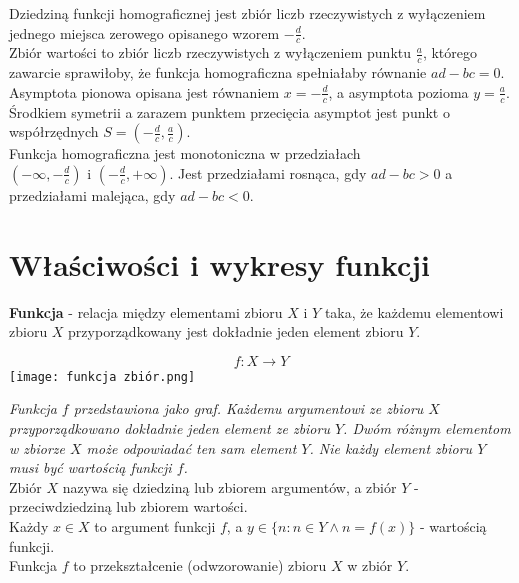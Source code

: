 \documentclass[14pt,a4paper]{extarticle}
\begin{document}
\noindent Dziedziną funkcji homograficznej jest zbiór liczb rzeczywistych z wyłączeniem jednego miejsca zerowego
opisanego wzorem $-\frac{d}{c}$.\hfill\break\\
 Zbiór wartości to zbiór liczb rzeczywistych z wyłączeniem punktu $\frac{a}{c}$,
którego zawarcie sprawiłoby, że funkcja homograficzna spełniałaby równanie $ad - bc = 0$.\hfill\break\\
Asymptota pionowa opisana jest równaniem $x = -\frac{d}{c}$, a asymptota pozioma $y = \frac{a}{c}$.\hfill\break\\
Środkiem symetrii a zarazem punktem przecięcia asymptot jest punkt o współrzędnych $S = \left(-\frac{d}{c}, \frac{a}{c}\right)$.\hfill\break\\
Funkcja homograficzna jest monotoniczna w przedziałach $\left(-\infty, -\frac{d}{c}\right) \text{ i } \left(-\frac{d}{c}, +\infty\right)$.
Jest przedziałami rosnąca, gdy $ad - bc > 0$ a przedziałami malejąca, gdy $ad - bc < 0$.
\newpage









   
   
   

\noindent\section{Właściwości i wykresy funkcji}
\noindent\textbf{Funkcja} - relacja między elementami zbioru $X$ i $Y$ taka, że każdemu elementowi
zbioru $X$ przyporządkowany jest dokładnie jeden element zbioru $Y$.

$$f:X \rightarrow Y$$
\texttt{[image: funkcja zbiór.png]}\hfill\break

\noindent \textit{Funkcja $f$ przedstawiona jako graf. Każdemu argumentowi ze zbioru $X$ przyporządkowano dokładnie jeden element ze zbioru $Y$. 
Dwóm różnym elementom w zbiorze $X$ może odpowiadać ten sam element $Y$. Nie każdy element zbioru $Y$ musi być wartością funkcji $f$.}\hfill\break\\
\noindent Zbiór $X$ nazywa się dziedziną lub zbiorem argumentów, a zbiór $Y$ - przeciwdziedziną lub zbiorem wartości.\\
Każdy $x \in X$ to argument funkcji $f$, a $y \in \{n: n \in Y \land n = f(x)\}$ - wartością funkcji.\\
Funkcja $f$ to przekształcenie (odwzorowanie) zbioru $X$ w zbiór $Y$.\hfill\break\\
\end{document}

